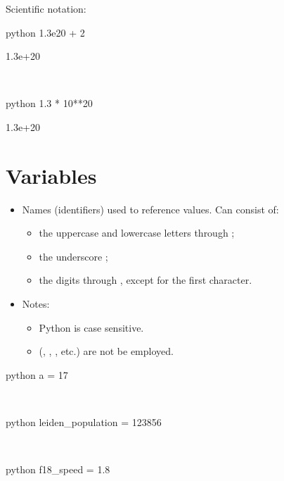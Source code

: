 \documentclass[aspectratio=1610,slidestop]{beamer}
\begin{document}
\begin{pframe}
Scientific notation:
\begin{ipython}
  \begin{pythonin}{python}
1.3e20 + 2
  \end{pythonin}
  \begin{pythonout}
1.3e+20
  \end{pythonout}
  \\

  \begin{pythonin}{python}
1.3 * 10**20
  \end{pythonin}
  \begin{pythonout}
1.3e+20
  \end{pythonout}
 \end{ipython}
\end{pframe}


\section{Variables}

\begin{pframe}
 \vspace{-0.75cm}
 \begin{itemize}
  \item Names (identifiers) used to reference values. Can consist of:
  \begin{itemize}
   \item the uppercase and lowercase letters  through ;
   \item the underscore \emp{\_};
   \item the digits  through , except for the first character.
  \end{itemize}
  \item Notes:
  \begin{itemize}
   \item Python is case sensitive.
   \item {} (, , , etc.) are not be employed.
  \end{itemize}
 \end{itemize}

 \begin{ipython}
  \begin{pythonin}{python}
a = 17
  \end{pythonin}
  \\
  \begin{pythonin}{python}
leiden_population = 123856
  \end{pythonin}
  \\
  \begin{pythonin}{python}
f18_speed = 1.8
  \end{pythonin}
 \end{ipython}
\end{pframe}
\end{document}
